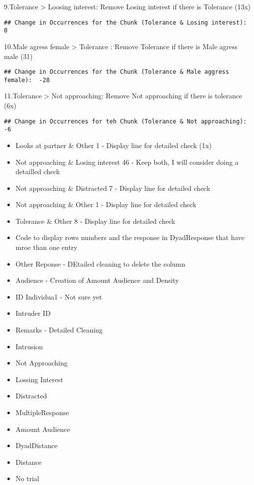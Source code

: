 \documentclass[
]{article}
\begin{document}
9.Tolerance \textgreater{} Loosing interest: Remove Losing interest if
there is Tolerance (13x)

\begin{verbatim}
## Change in Occurrences for the Chunk (Tolerance & Losing interest):  0
\end{verbatim}

10.Male agress female \textgreater{} Tolerance : Remove Tolerance if
there is Male agress male (31)

\begin{verbatim}
## Change in Occurrences for the Chunk (Tolerance & Male aggress female):  -28
\end{verbatim}

11.Tolerance \textgreater{} Not approaching: Remove Not approaching if
there is tolerance (6x)

\begin{verbatim}
## Change in Occurrences for teh Chunk (Tolerance & Not approaching):  -6
\end{verbatim}

\begin{itemize}
\item
  Looks at partner \& Other 1 - Display line for detailed check (1x)
\item
  Not approaching \& Losing interest 46 - Keep both, I will consider
  doing a detailled check
\item
  Not approaching \& Distracted 7 - Display line for detailed check
\item
  Not approaching \& Other 1 - Display line for detailed check
\item
  Tolerance \& Other 8 - Display line for detailed check
\item
  Code to display rows numbers and the response in DyadResponse that
  have mroe than one entry
\item
  Other Reponse - DEtailed cleaning to delete the column
\item
  Audience - Creation of Amount Audience and Density
\item
  ID Individua1 - Not sure yet
\item
  Intruder ID
\item
  Remarks - Detailed Cleaning
\item
  Intrusion
\item
  Not Approaching
\item
  Lossing Interest
\item
  Distracted
\item
  MultipleResponse
\item
  Amount Audience
\item
  DyadDistance
\item
  Distance
\item
  No trial
\end{itemize}
\end{document}
